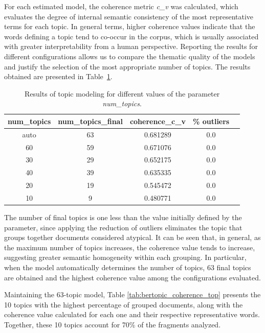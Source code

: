 \documentclass[11pt,a4paper]{article}
\begin{document}
For each estimated model, the coherence metric \textit{c\_v} was calculated, which evaluates the degree of internal semantic consistency of the most representative terms for each topic. In general terms, higher coherence values indicate that the words defining a topic tend to co-occur in the corpus, which is usually associated with greater interpretability from a human perspective. Reporting the results for different configurations allows us to compare the thematic quality of the models and justify the selection of the most appropriate number of topics. The results obtained are presented in Table~\ref{tab:coherence_topics}.

\begin{table}[H]
	\centering
	\caption{Results of topic modeling for different values of the parameter \textit{num\_topics}.}
	\begin{tabular}{ccccc}
		\hline
		\textbf{num\_topics} & \textbf{num\_topics\_final} & \textbf{coherence\_c\_v} & \textbf{\% outliers} \\
		\hline
		auto & 63 & 0.681289 & 0.0 \\
		60   & 59 & 0.671076 & 0.0 \\
		30   & 29 & 0.652175 & 0.0 \\
		40   & 39 & 0.635335 & 0.0 \\
		20   & 19 & 0.545472 & 0.0 \\
		10   & 9  & 0.480771 & 0.0 \\
		\hline
	\end{tabular}
	\label{tab:coherence_topics}
\end{table}

The number of final topics is one less than the value initially defined by the parameter, since applying the reduction of outliers eliminates the topic that groups together documents considered atypical. It can be seen that, in general, as the maximum number of topics increases, the coherence value tends to increase, suggesting greater semantic homogeneity within each grouping. In particular, when the model automatically determines the number of topics, 63 final topics are obtained and the highest coherence value among the configurations evaluated.

		
Maintaining the 63-topic model, Table \ref{tab:bertopic_coherence_top} presents the 10 topics with the highest percentage of grouped documents, along with the coherence value calculated for each one and their respective representative words. Together, these 10 topics account for 70\% of the fragments analyzed.
		
\end{document}
